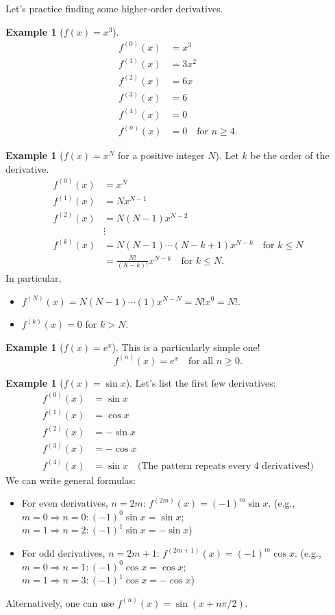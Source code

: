 \documentclass[11pt, a4paper]{article}
\theoremstyle{plain}
\theoremstyle{definition}
\newtheorem{example}[theorem]{Example} %
\theoremstyle{remark}
\begin{document}
Let's practice finding some higher-order derivatives.

\begin{example}[$f(x) = x^3$]
\begin{align*}
f^{(0)}(x) &= x^3 \\
f^{(1)}(x) &= 3x^2 \\
f^{(2)}(x) &= 6x \\
f^{(3)}(x) &= 6 \\
f^{(4)}(x) &= 0 \\
f^{(n)}(x) &= 0 \quad \text{for } n \ge 4.
\end{align*}
\end{example}

\begin{example}[$f(x) = x^N$ for a positive integer $N$]
Let $k$ be the order of the derivative.
\begin{align*}
f^{(0)}(x) &= x^N \\
f^{(1)}(x) &= N x^{N-1} \\
f^{(2)}(x) &= N(N-1) x^{N-2} \\
&\vdots \\
f^{(k)}(x) &= N(N-1)\dotsb(N-k+1) x^{N-k} \quad \text{for } k \le N \\
&= \frac{N!}{(N-k)!} x^{N-k} \quad \text{for } k \le N.
\end{align*}
In particular,
\begin{itemize}
    \item $f^{(N)}(x) = N(N-1)\dotsb(1) x^{N-N} = N! x^0 = N!$.
    \item $f^{(k)}(x) = 0$ for $k > N$.
\end{itemize}
\end{example}

\begin{example}[$f(x) = e^x$]
This is a particularly simple one!
\[ f^{(n)}(x) = e^x \quad \text{for all } n \ge 0. \]
\end{example}

\begin{example}[$f(x) = \sin x$]
Let's list the first few derivatives:
\begin{align*}
f^{(0)}(x) &= \sin x \\
f^{(1)}(x) &= \cos x \\
f^{(2)}(x) &= -\sin x \\
f^{(3)}(x) &= -\cos x \\
f^{(4)}(x) &= \sin x \quad \text{(The pattern repeats every 4 derivatives!)}
\end{align*}
We can write general formulas:
\begin{itemize}
    \item For even derivatives, $n=2m$: $f^{(2m)}(x) = (-1)^m \sin x$.
    (e.g., $m=0 \Rightarrow n=0: (-1)^0 \sin x = \sin x$; $m=1 \Rightarrow n=2: (-1)^1 \sin x = -\sin x$)
    \item For odd derivatives, $n=2m+1$: $f^{(2m+1)}(x) = (-1)^m \cos x$.
    (e.g., $m=0 \Rightarrow n=1: (-1)^0 \cos x = \cos x$; $m=1 \Rightarrow n=3: (-1)^1 \cos x = -\cos x$)
\end{itemize}
Alternatively, one can use $f^{(n)}(x) = \sin(x + n\pi/2)$.
\end{example}
\end{document}
